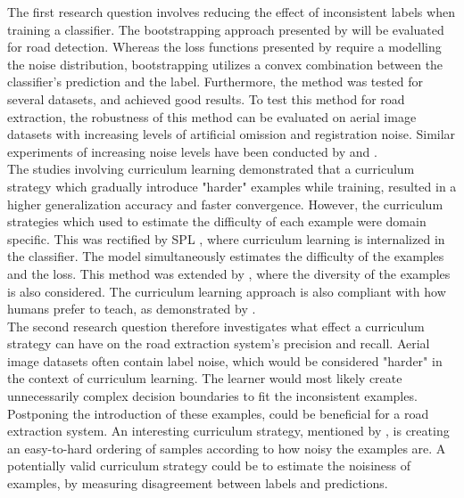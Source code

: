 The first research question involves reducing the effect of inconsistent labels when training a classifier. The bootstrapping approach presented by \cite{Reed_noisy_labels_bootstrapping} will be evaluated for road detection. Whereas the loss functions presented by \citep{Mnih_aerial_images_noisy} require a modelling the noise distribution,  bootstrapping utilizes a convex combination between the classifier's prediction and the label. Furthermore, the method was tested for several datasets, and achieved good results. To test this method for road extraction, the robustness of this method can be evaluated on aerial image datasets with increasing levels of artificial omission and registration noise. Similar experiments of increasing noise levels have been conducted by \citep{Sukhbaatar_noisy_network_learning} and \citep{Reed_noisy_labels_bootstrapping}.\\

The studies involving curriculum learning demonstrated that a curriculum strategy which gradually introduce "harder" examples while training, resulted in a higher generalization accuracy and faster convergence. However, the curriculum strategies which \cite{Bengio_curriculumlearning} used to estimate the difficulty of each example were domain specific. This was rectified by \ac{SPL} \citep{Kumar_self_paced_learning}, where curriculum learning is internalized in the classifier. The model simultaneously estimates the difficulty of the examples and the loss. This method was extended by \citep{Lu_self-paced_learning_diversity}, where the diversity of the examples is  also considered. The curriculum learning approach is also compliant with how humans prefer to teach, as demonstrated by \cite{Khan_human_teach}.\\

The second research question therefore investigates what effect a curriculum strategy can have on the road extraction system's precision and recall. Aerial image datasets often contain label noise, which would be considered "harder" in the context of curriculum learning. The learner would most likely create unnecessarily complex decision boundaries to fit the inconsistent examples. Postponing the introduction of these examples, could be beneficial for a road extraction system. An interesting curriculum strategy, mentioned by \cite{Bengio_curriculumlearning}, is creating an easy-to-hard ordering of samples according to how noisy the examples are. A potentially valid curriculum strategy could be to estimate the noisiness of examples, by measuring disagreement between labels and predictions.\\
